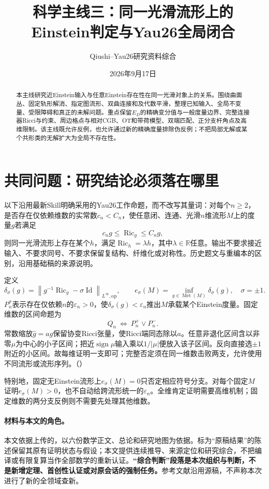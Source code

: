 \documentclass[UTF8,fontset=fandol,zihao=-4]{ctexart}
\title{科学主线三：同一光滑流形上的\\[2mm]Einstein判定与Yau26全局闭合}
\author{Qiushi--Yau26研究资料综合}
\date{2026年9月17日}
\theoremstyle{research}
\DeclareMathOperator{\Ric}{Ric}
\DeclareMathOperator{\Id}{Id}
\DeclareMathOperator{\Met}{Met}
\newcommand{\R}{\mathbb R}
\newcommand{\op}{\mathrm{op}}
\newcommand{\norm}[1]{\left\|#1\right\|}
\numberwithin{equation}{section}
\begin{document}
\maketitle
\begin{abstract}
本主线研究近Einstein输入与任意Einstein存在性在同一光滑对象上的关系。围绕曲面丛、固定轨形解消、指定图流形、双曲连接和及代数平滑，整理已知输入、全局不变量、受限障碍和真正的未解问题。重点保留$E_D$的精确变分值与一般度量边界、完整连接器Ricci与约束、周边格点与相对CGB、OT和带荷模型、双端匹配、正分支杆角点及高维限制。该主线既允许反例，也允许通过新的精确度量排除伪反例；不把局部无解或某个共形类的无解扩大为全局不存在性。
\end{abstract}
\tableofcontents
\clearpage

\section{共同问题：研究结论必须落在哪里}
以下沿用最新Skill明确采用的Yau26工作命题，而不改写其量词：对每个$n\ge2$，是否存在仅依赖维数的实常数$c_n<C_n$，使任意闭、连通、光滑$n$维流形$M$上的度量$g$若满足
\[
c_ng\le\Ric_g\le C_ng,
\]
则同一光滑流形上存在某个$h$，满足$\Ric_h=\lambda h$，其中$\lambda\in\R$任意。输出不要求接近输入、不要求同号、不要求保留复结构、纤维化或对称性。历史题文与重编本的区别，沿用基础稿的来源说明\cite{F,Overview}。

定义
\[
\delta_\sigma(g)=\norm{g^{-1}\Ric_g-\sigma\Id}_{L^\infty,\op},\qquad
e_\sigma(M)=\inf_{g\in\Met(M)}\delta_\sigma(g),\quad\sigma=\pm1.
\]
$P_n^\sigma$表示存在仅依赖$n$的$\varepsilon_n>0$，使$\delta_\sigma(g)<\varepsilon_n$推出$M$承载某个Einstein度量。固定维数的区间命题为
\[
Q_n\ \Longleftrightarrow\ P_n^+\lor P_n^-.
\]
常数缩放$\widehat g=ag$保留协变Ricci张量，使Ricci端同态除以$a$。任意非退化区间含以非零$\mu$为中心的小子区间；把近$\operatorname{sign}\mu$输入乘以$1/|\mu|$便放入该子区间。反向直接选$\pm1$附近的小区间。故每维证明一支即可；完整否定须在同一维数击败两支，允许使用不同流形或流形序列。\cite{F}（）

特别地，固定无Einstein流形上$e_\sigma(M)=0$只否定相应符号分支。对每个固定$M$证明$e_\sigma(M)>0$，也不自动给跨流形统一的$\varepsilon_n$。全维肯定证明需要高维机制；固定维数的两分支反例则不需要先处理其他维数。

\paragraph{材料与本文的角色。}
本文依据上传的，以六份数学正文、总论和研究地图为依据。标为“原稿结果”的陈述保留其原有证明状态与假设；本文提供连续推导、来源定位和研究综合，不把编译或有限复算当作全部数学的重新认证。\textbf{“综合判断”段落是本次组织与判断，不是新增定理、首创性认证或对原会话的强制任务。}参考文献沿用源稿，不声称本次进行了新的全领域查新。
\end{document}
